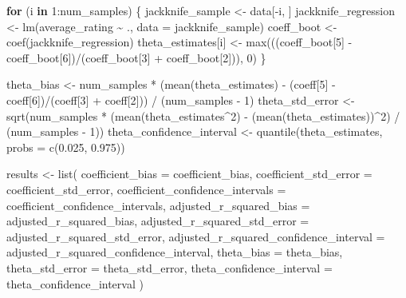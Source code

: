 \documentclass[
]{article}
\newenvironment{Shaded}{\begin{snugshade}}{\end{snugshade}}
\newcommand{\AttributeTok}[1]{\textcolor[rgb]{0.77,0.63,0.00}{#1}}
\newcommand{\ControlFlowTok}[1]{\textcolor[rgb]{0.13,0.29,0.53}{\textbf{#1}}}
\newcommand{\DecValTok}[1]{\textcolor[rgb]{0.00,0.00,0.81}{#1}}
\newcommand{\FloatTok}[1]{\textcolor[rgb]{0.00,0.00,0.81}{#1}}
\newcommand{\FunctionTok}[1]{\textcolor[rgb]{0.00,0.00,0.00}{#1}}
\newcommand{\NormalTok}[1]{#1}
\newcommand{\OtherTok}[1]{\textcolor[rgb]{0.56,0.35,0.01}{#1}}
\newcommand{\SpecialCharTok}[1]{\textcolor[rgb]{0.00,0.00,0.00}{#1}}
\begin{document}
\begin{Shaded}
\begin{Highlighting}[]
  \ControlFlowTok{for}\NormalTok{ (i }\ControlFlowTok{in} \DecValTok{1}\SpecialCharTok{:}\NormalTok{num\_samples) \{}
\NormalTok{    jackknife\_sample }\OtherTok{\textless{}{-}}\NormalTok{ data[}\SpecialCharTok{{-}}\NormalTok{i, ]}
\NormalTok{    jackknife\_regression }\OtherTok{\textless{}{-}} \FunctionTok{lm}\NormalTok{(average\_rating }\SpecialCharTok{\textasciitilde{}}\NormalTok{ ., }\AttributeTok{data =}\NormalTok{ jackknife\_sample)}
\NormalTok{    coeff\_boot }\OtherTok{\textless{}{-}} \FunctionTok{coef}\NormalTok{(jackknife\_regression)}
\NormalTok{    theta\_estimates[i] }\OtherTok{\textless{}{-}} \FunctionTok{max}\NormalTok{(((coeff\_boot[}\DecValTok{5}\NormalTok{] }\SpecialCharTok{{-}}\NormalTok{ coeff\_boot[}\DecValTok{6}\NormalTok{])}\SpecialCharTok{/}\NormalTok{(coeff\_boot[}\DecValTok{3}\NormalTok{] }\SpecialCharTok{+}\NormalTok{ coeff\_boot[}\DecValTok{2}\NormalTok{])), }\DecValTok{0}\NormalTok{)}
\NormalTok{  \}}
  
\NormalTok{  theta\_bias }\OtherTok{\textless{}{-}}\NormalTok{ num\_samples }\SpecialCharTok{*}\NormalTok{ (}\FunctionTok{mean}\NormalTok{(theta\_estimates) }\SpecialCharTok{{-}}\NormalTok{ (coeff[}\DecValTok{5}\NormalTok{] }\SpecialCharTok{{-}}\NormalTok{ coeff[}\DecValTok{6}\NormalTok{])}\SpecialCharTok{/}\NormalTok{(coeff[}\DecValTok{3}\NormalTok{] }\SpecialCharTok{+}\NormalTok{ coeff[}\DecValTok{2}\NormalTok{])) }\SpecialCharTok{/}\NormalTok{ (num\_samples }\SpecialCharTok{{-}} \DecValTok{1}\NormalTok{)}
\NormalTok{  theta\_std\_error }\OtherTok{\textless{}{-}} \FunctionTok{sqrt}\NormalTok{(num\_samples }\SpecialCharTok{*}\NormalTok{ (}\FunctionTok{mean}\NormalTok{(theta\_estimates}\SpecialCharTok{\^{}}\DecValTok{2}\NormalTok{) }\SpecialCharTok{{-}}\NormalTok{ (}\FunctionTok{mean}\NormalTok{(theta\_estimates))}\SpecialCharTok{\^{}}\DecValTok{2}\NormalTok{) }\SpecialCharTok{/}\NormalTok{ (num\_samples }\SpecialCharTok{{-}} \DecValTok{1}\NormalTok{))}
\NormalTok{  theta\_confidence\_interval }\OtherTok{\textless{}{-}} \FunctionTok{quantile}\NormalTok{(theta\_estimates, }\AttributeTok{probs =} \FunctionTok{c}\NormalTok{(}\FloatTok{0.025}\NormalTok{, }\FloatTok{0.975}\NormalTok{))}
  
\NormalTok{  results }\OtherTok{\textless{}{-}} \FunctionTok{list}\NormalTok{(}
    \AttributeTok{coefficient\_bias =}\NormalTok{ coefficient\_bias,}
    \AttributeTok{coefficient\_std\_error =}\NormalTok{ coefficient\_std\_error,}
    \AttributeTok{coefficient\_confidence\_intervals =}\NormalTok{ coefficient\_confidence\_intervals,}
    \AttributeTok{adjusted\_r\_squared\_bias =}\NormalTok{ adjusted\_r\_squared\_bias,}
    \AttributeTok{adjusted\_r\_squared\_std\_error =}\NormalTok{ adjusted\_r\_squared\_std\_error,}
    \AttributeTok{adjusted\_r\_squared\_confidence\_interval =}\NormalTok{ adjusted\_r\_squared\_confidence\_interval,}
    \AttributeTok{theta\_bias =}\NormalTok{ theta\_bias,}
    \AttributeTok{theta\_std\_error =}\NormalTok{ theta\_std\_error,}
    \AttributeTok{theta\_confidence\_interval =}\NormalTok{ theta\_confidence\_interval}
\NormalTok{  )}
  

\end{Highlighting}
\end{Shaded}
\end{document}
